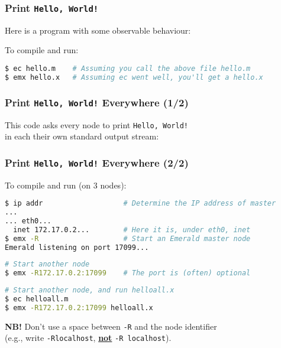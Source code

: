 \begin{frame}[fragile]

\frametitle{Print \texttt{Hello, World!}}

Here is a program with some observable behaviour:


To compile and run:

\begin{lstlisting}[language=bash]
$ ec hello.m    # Assuming you call the above file hello.m
$ emx hello.x   # Assuming ec went well, you'll get a hello.x
\end{lstlisting}

\end{frame}


\begin{frame}[fragile]

\frametitle{Print \texttt{Hello, World!} Everywhere (1/2)}

This code asks every node to print \texttt{Hello, World!}\\ in each
their own standard output stream:


\end{frame}

\begin{frame}[fragile]

\frametitle{Print \texttt{Hello, World!} Everywhere (2/2)}

To compile and run (on 3 nodes):

\begin{lstlisting}[language=bash]
$ ip addr                   # Determine the IP address of master
...
... eth0...
  inet 172.17.0.2...        # Here it is, under eth0, inet
$ emx -R                    # Start an Emerald master node
Emerald listening on port 17099...
\end{lstlisting}

\begin{lstlisting}[language=bash]
# Start another node
$ emx -R172.17.0.2:17099    # The port is (often) optional
\end{lstlisting}

\begin{lstlisting}[language=bash]
# Start another node, and run helloall.x
$ ec helloall.m             
$ emx -R172.17.0.2:17099 helloall.x
\end{lstlisting}

\textbf{NB!} Don't use a space between \texttt{-R} and the node
identifier\\ (e.g., write \texttt{-Rlocalhost},
\textbf{\underline{not}} \texttt{-R localhost}).

\end{frame}
